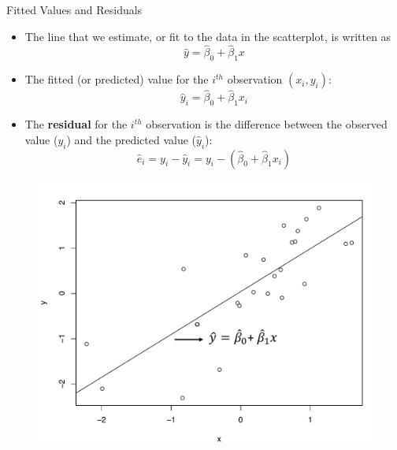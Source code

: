 \documentclass[11pt, fleqn]{beamer}\usepackage[]{graphicx}\usepackage[]{color}
\begin{document}
\begin{frame}{Fitted Values and Residuals}
\begin{itemize}
\item The line that we estimate, or fit to the data in the scatterplot, is written as
$$\hat{y} = \hat{\beta}_0 + \hat{\beta}_1 x$$

\item The fitted (or predicted) value for the $i^{th}$ observation $(x_i, y_i)$:
$$\hat{y}_i = \hat{\beta}_0 + \hat{\beta}_1 x_i$$

\item The \textbf{residual} for the $i^{th}$ observation is the difference between the observed value ($y_i$) and the predicted value ($\hat{y}_i$):\\
$$\hat{e}_i = y_i - \hat{y}_i = y_i - (\hat{\beta}_0 + \hat{\beta}_1 x_i)$$
\end{itemize}
\end{frame}

\begin{frame}
\begin{figure}
\includegraphics[scale=0.5]{figure/scatter2_2.pdf}
\end{figure}
\end{frame}
\end{document}
